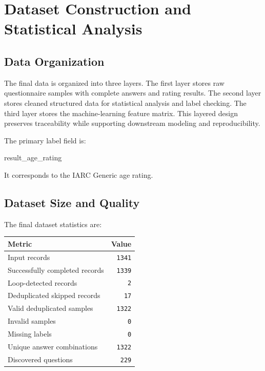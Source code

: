 \documentclass[UTF8,a4paper,12pt]{ctexart}
\newenvironment{Shaded}{\begin{snugshade}}{\end{snugshade}}
\newcommand{\NormalTok}[1]{#1}
\renewenvironment{Shaded}{%
    \vspace{0.35em}%
    \begin{tcolorbox}[enhanced,breakable,colback=zjucodebg,colframe=zjucodeframe,boxrule=0.45pt,leftrule=2.2pt,arc=1.6mm,left=1.8mm,right=1.8mm,top=1.2mm,bottom=1.2mm]%
  }{%
    \end{tcolorbox}%
    \vspace{0.25em}%
  }%
\newcounter{none}
\begin{document}
\section{Dataset Construction and Statistical Analysis}\label{dataset-construction-and-statistical-analysis}

\subsection{Data Organization}\label{data-organization}

The final data is organized into three layers. The first layer stores raw questionnaire samples with complete answers and rating results. The second layer stores cleaned structured data for statistical analysis and label checking. The third layer stores the machine-learning feature matrix. This layered design preserves traceability while supporting downstream modeling and reproducibility.

The primary label field is:

\begin{Shaded}
\begin{Highlighting}[]
\NormalTok{result\_age\_rating}
\end{Highlighting}
\end{Shaded}

It corresponds to the IARC Generic age rating.

\subsection{Dataset Size and Quality}\label{dataset-size-and-quality}

The final dataset statistics are:

{\def\LTcaptype{none} %
\begin{longtable}[]{@{}lr@{}}
\toprule\noalign{}
Metric & Value \\
\midrule\noalign{}
\endhead
\bottomrule\noalign{}
\endlastfoot
Input records & \texttt{1341} \\
Successfully completed records & \texttt{1339} \\
Loop-detected records & \texttt{2} \\
Deduplicated skipped records & \texttt{17} \\
Valid deduplicated samples & \texttt{1322} \\
Invalid samples & \texttt{0} \\
Missing labels & \texttt{0} \\
Unique answer combinations & \texttt{1322} \\
Discovered questions & \texttt{229} \\
\end{longtable}
}
\end{document}
